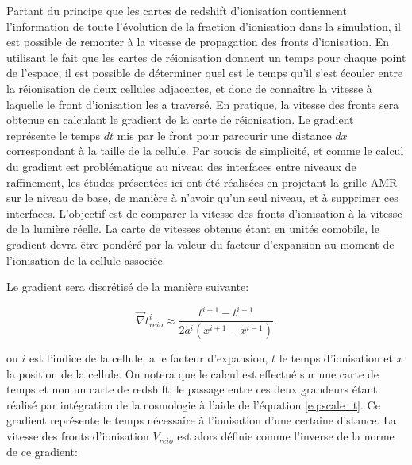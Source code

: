 Partant du principe que les cartes de redshift d'ionisation contiennent l'information de toute l'évolution de la fraction d'ionisation dans la simulation, il est possible de remonter à la vitesse de propagation des fronts d'ionisation.
En utilisant le fait que les cartes de réionisation donnent un temps pour chaque point de l'espace, il est possible de déterminer quel est le temps qu'il s'est écouler entre la réionisation de deux cellules adjacentes, et donc de connaître la vitesse à laquelle le front d'ionisation les a traversé.
En pratique, la vitesse des fronts sera obtenue en calculant le gradient de la carte de réionisation.
Le gradient représente le temps $dt$ mis par le front pour parcourir une distance $dx$ correspondant à la taille de la cellule.
Par soucis de simplicité, et comme le calcul du gradient est problématique au niveau des interfaces entre niveaux de raffinement, les études présentées ici ont été réalisées en projetant la grille \ac{AMR} sur le niveau de base, de manière à n'avoir qu'un seul niveau, et à supprimer ces interfaces.
L'objectif est de comparer la vitesse des fronts d'ionisation à la vitesse de la lumière réelle.
La carte de vitesses obtenue étant en unités comobile, le gradient devra être pondéré par la valeur du facteur d'expansion au moment de l'ionisation de la cellule associée.


Le gradient sera discrétisé de la manière suivante:

\begin{equation}
\vec{\nabla} t_{reio}^i \approx \frac{t^{i+1}  - t^{i-1}}{2a^i \left( x^{i+1}  - x^{i-1} \right)}.
\end{equation}

ou $i$ est l'indice de la cellule, a le facteur d'expansion, $t$ le temps d'ionisation et $x$  la position de la cellule.
On notera que le calcul est effectué sur une carte de temps et non un carte de redshift, le passage entre ces deux grandeurs étant réalisé par intégration de la cosmologie à l'aide de l'équation \ref{eq:scale_t}.
Ce gradient représente le temps nécessaire à l'ionisation d'une certaine distance.
La vitesse des fronts d'ionisation $V_{reio}$ est alors définie comme l'inverse de la norme de ce gradient:

